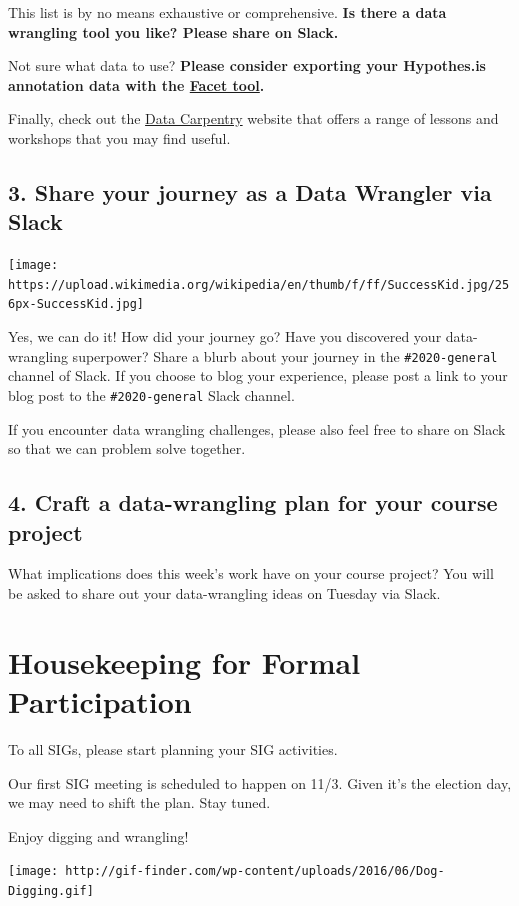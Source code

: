 \documentclass[
]{book}
\begin{document}
This list is by no means exhaustive or comprehensive. \textbf{Is there a data wrangling tool you like? Please share on Slack.}

Not sure what data to use? \textbf{Please consider exporting your Hypothes.is annotation data with the \href{https://jonudell.info/h/facet/}{Facet tool}.}

Finally, check out the \href{https://datacarpentry.org/lessons/\#social-science-curriculum}{Data Carpentry} website that offers a range of lessons and workshops that you may find useful.

\hypertarget{share-your-journey-as-a-data-wrangler-via-slack}{%
\subsection*{3. Share your journey as a Data Wrangler via Slack}\label{share-your-journey-as-a-data-wrangler-via-slack}}

\texttt{[image: https://upload.wikimedia.org/wikipedia/en/thumb/f/ff/SuccessKid.jpg/256px-SuccessKid.jpg]}

Yes, we can do it! How did your journey go? Have you discovered your data-wrangling superpower? Share a blurb about your journey in the \texttt{\#2020-general} channel of Slack. If you choose to blog your experience, please post a link to your blog post to the \texttt{\#2020-general} Slack channel.

If you encounter data wrangling challenges, please also feel free to share on Slack so that we can problem solve together.

\hypertarget{craft-a-data-wrangling-plan-for-your-course-project}{%
\subsection*{4. Craft a data-wrangling plan for your course project}\label{craft-a-data-wrangling-plan-for-your-course-project}}

What implications does this week's work have on your course project? You will be asked to share out your data-wrangling ideas on Tuesday via Slack.

\hypertarget{housekeeping-for-formal-participation}{%
\section{Housekeeping for Formal Participation}\label{housekeeping-for-formal-participation}}

To all SIGs, please start planning your SIG activities.

Our first SIG meeting is scheduled to happen on 11/3. Given it's the election day, we may need to shift the plan. Stay tuned.

Enjoy digging and wrangling!

\texttt{[image: http://gif-finder.com/wp-content/uploads/2016/06/Dog-Digging.gif]}

  
\end{document}
